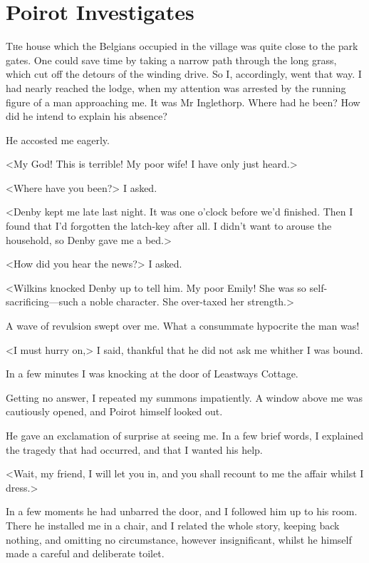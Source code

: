 \chapter{Poirot Investigates} 

\lettrine{T}{h}e house which the Belgians occupied in the village was quite close to the park gates. One could save time by taking a narrow path through the long grass, which cut off the detours of the winding drive. So I, accordingly, went that way. I had nearly reached the lodge, when my attention was arrested by the running figure of a man approaching me. It was Mr Inglethorp. Where had he been? How did he intend to explain his absence? 

 He accosted me eagerly. 

 <My God! This is terrible! My poor wife! I have only just heard.> 

 <Where have you been?> I asked. 

 <Denby kept me late last night. It was one o'clock before we'd finished. Then I found that I'd forgotten the latch-key after all. I didn't want to arouse the household, so Denby gave me a bed.> 

 <How did you hear the news?> I asked. 

 <Wilkins knocked Denby up to tell him. My poor Emily! She was so self-sacrificing—such a noble character. She over-taxed her strength.> 

 A wave of revulsion swept over me. What a consummate hypocrite the man was! 

 <I must hurry on,> I said, thankful that he did not ask me whither I was bound. 

 In a few minutes I was knocking at the door of Leastways Cottage. 

 Getting no answer, I repeated my summons impatiently. A window above me was cautiously opened, and Poirot himself looked out. 

 He gave an exclamation of surprise at seeing me. In a few brief words, I explained the tragedy that had occurred, and that I wanted his help. 

 <Wait, my friend, I will let you in, and you shall recount to me the affair whilst I dress.> 

 In a few moments he had unbarred the door, and I followed him up to his room. There he installed me in a chair, and I related the whole story, keeping back nothing, and omitting no circumstance, however insignificant, whilst he himself made a careful and deliberate toilet. 

